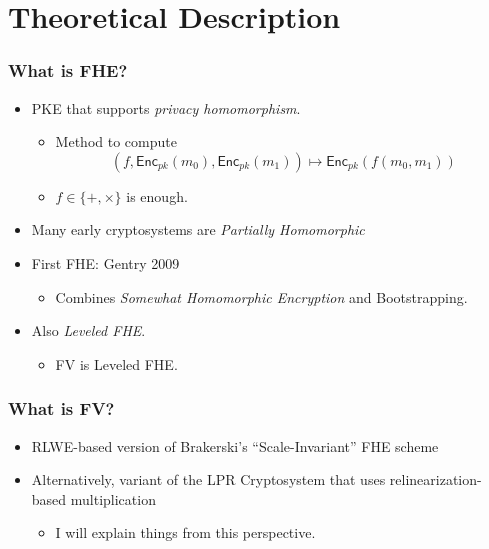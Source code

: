 \documentclass{beamer}
\theoremstyle{definition}
\newcommand{\enc}{\mathsf{Enc}}
\begin{document}
\section{Theoretical Description}

\begin{frame}
	\frametitle{What is FHE?}
	\begin{itemize}
		\item PKE that supports \emph{privacy homomorphism}.\pause{}
		\begin{itemize}
			\item Method to compute
			\begin{equation*}
			(f, \enc_{pk}(m_0),\enc_{pk}(m_1))\mapsto \enc_{pk}(f(m_0,m_1))	
			\end{equation*}\pause{}
			\item $f \in \{+, \times\}$ is enough\pause{}.
		\end{itemize}
		\item Many early cryptosystems are \emph{Partially Homomorphic}\pause{}
		\item First FHE: Gentry 2009\pause{}
		\begin{itemize}
			\item Combines \emph{Somewhat Homomorphic Encryption} and Bootstrapping.\pause{}
		\end{itemize}
	\item Also \emph{Leveled FHE}.\pause{}
	\begin{itemize}
		\item FV is Leveled FHE.
	\end{itemize}
	\end{itemize}
\end{frame}

\begin{frame}
	\frametitle{What is FV?}
	\begin{itemize}
		\item RLWE-based version of Brakerski's ``Scale-Invariant'' FHE scheme\pause{}
		\item Alternatively, variant of the LPR Cryptosystem that uses relinearization-based multiplication\pause{}
		\begin{itemize}
			\item I will explain things from this perspective.
		\end{itemize}
	\end{itemize}
\end{frame}
\end{document}
